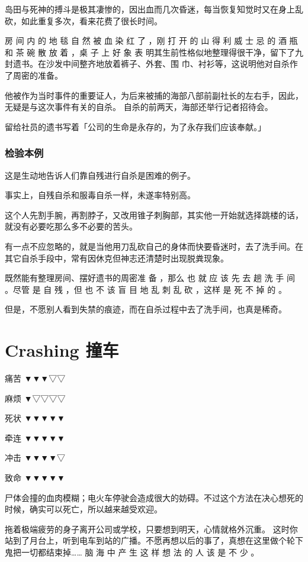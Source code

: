 \documentclass[UTF8]{ctexart}
\begin{document}
岛田与死神的搏斗是极其凄惨的，因出血而几次昏迷，每当恢复知觉时又在身上乱砍，如此重复多次，看来花费了很长时间。

房 间 内 的 地 毯 自 然 被 血 染 红 了 ，刚 打 开 的 山 得 利 威 士 忌 的 酒 瓶 和 茶 碗 散 放 着 ，桌 子 上 好 象 表 明其生前性格似地整理得很干净，留下了九封遗书。在沙发中间整齐地放着裤子、外套、围 巾、衬衫等，这说明他对自杀作了周密的准备。

他被作为当时事件的重要证人，为后来被捕的海部八部前副社长的左右手，因此，无疑是与这次事件有关的自杀。
自杀的前两天，海部还举行记者招待会。

留给社员的遗书写着「公司的生命是永存的，为了永存我们应该奉献。」

\subsubsection*{检验本例}

这是生动地告诉人们靠自残进行自杀是困难的例子。

事实上，自残自杀和服毒自杀一样，未遂率特别高。

这个人先割手腕，再割脖子，又改用锥子刺胸部，其实他一开始就选择跳楼的话，就没有必要吃那么多不必要的苦头。

有一点不应忽略的，就是当他用刀乱砍自己的身体而快要昏迷时，去了洗手间。在其它自杀手段中，常有因休克但神志还清楚时出现脱粪现象。

既然能有整理房间、摆好遗书的周密准 备 ，那么 也 就 应 该 先 去 趟 洗 手 间 。尽管 是 自 残 ，但 也 不 该 盲 目 地 乱 刺 乱 砍 ，这样 是 死 不 掉 的 。

但是，不愿别人看到失禁的痕迹，而在自杀过程中去了洗手间，也真是稀奇。

\newpage

\section{Crashing 撞车}

痛苦 ▼▼▼▽▽

麻烦 ▼▽▽▽▽

死状 ▼▼▼▼▼

牵连 ▼▼▼▼▼

冲击 ▼▼▼▼▽

致命 ▼▼▼▼▼

尸体会撞的血肉模糊；电火车停驶会造成很大的妨碍。不过这个方法在决心想死的时候，确实可以死亡，所以越来越受欢迎。

拖着极端疲劳的身子离开公司或学校，只要想到明天，心情就格外沉重。
这时你站到了月台上，听到电车到站的广播。不愿再想以后的事了，真想在这里做个轮下鬼把一切都结束掉……
脑 海 中 产 生 这 样 想 法 的 人 该 是 不 少 。
\end{document}
